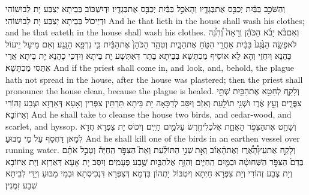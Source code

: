 {וְהַשֹּׁכֵ֣ב בַּבַּ֔יִת יְכַבֵּ֖ס אֶת\maqqaf בְּגָדָ֑יו וְהָאֹכֵ֣ל בַּבַּ֔יִת יְכַבֵּ֖ס אֶת\maqqaf בְּגָדָֽיו׃}
{וּדְיִשְׁכּוֹב בְּבֵיתָא יְצַבַּע יָת לְבוּשׁוֹהִי וּדְיֵיכוֹל בְּבֵיתָא יְצַבַּע יָת לְבוּשׁוֹהִי׃}
{And he that lieth in the house shall wash his clothes; and he that eateth in the house shall wash his clothes.}{}
{וְאִם\maqqaf בֹּ֨א יָבֹ֜א הַכֹּהֵ֗ן וְרָאָה֙ וְ֠הִנֵּ֠ה לֹא\maqqaf פָשָׂ֤ה הַנֶּ֙גַע֙ בַּבַּ֔יִת אַחֲרֵ֖י הִטֹּ֣חַ אֶת\maqqaf הַבָּ֑יִת וְטִהַ֤ר הַכֹּהֵן֙ אֶת\maqqaf הַבַּ֔יִת כִּ֥י נִרְפָּ֖א הַנָּֽגַע׃}
{וְאִם מֵיעָל יֵיעוֹל כָּהֲנָא וְיִחְזֵי וְהָא לָא אוֹסֵיף מַכְתָּשָׁא בְּבֵיתָא בָּתַר דְּאִתְּשָׁע יָת בֵּיתָא וְיִדְכֵּי כָהֲנָא יָת בֵּיתָא אֲרֵי אִתַּסִּי מַכְתָּשָׁא׃}
{And if the priest shall come in, and look, and, behold, the plague hath not spread in the house, after the house was plastered; then the priest shall pronounce the house clean, because the plague is healed.}{}
{וְלָקַ֛ח לְחַטֵּ֥א אֶת\maqqaf הַבַּ֖יִת שְׁתֵּ֣י צִפֳּרִ֑ים וְעֵ֣ץ אֶ֔רֶז וּשְׁנִ֥י תוֹלַ֖עַת וְאֵזֹֽב׃}
{וְיִסַּב לְדַכָּאָה יָת בֵּיתָא תַּרְתֵּין צִפְּרִין וְאָעָא דְּאַרְזָא וּצְבַע זְהוֹרִי וְאֵיזוֹבָא׃}
{And he shall take to cleanse the house two birds, and cedar-wood, and scarlet, and hyssop.}{}
{וְשָׁחַ֖ט אֶת\maqqaf הַצִּפֹּ֣ר הָאֶחָ֑ת אֶל\maqqaf כְּלִי\maqqaf חֶ֖רֶשׂ עַל\maqqaf מַ֥יִם חַיִּֽים׃}
{וְיִכּוֹס יָת צִפְּרָא חֲדָא לְמָאן דַּחֲסַף עַל מֵי מַבּוּעַ׃}
{And he shall kill one of the birds in an earthen vessel over running water.}{}
{וְלָקַ֣ח אֶת\maqqaf עֵֽץ\maqqaf הָ֠אֶ֠רֶז וְאֶת\maqqaf הָ֨אֵזֹ֜ב וְאֵ֣ת \legarmeh  שְׁנִ֣י הַתּוֹלַ֗עַת וְאֵת֮ הַצִּפֹּ֣ר הַֽחַיָּה֒ וְטָבַ֣ל אֹתָ֗ם בְּדַם֙ הַצִּפֹּ֣ר הַשְּׁחוּטָ֔ה וּבַמַּ֖יִם הַֽחַיִּ֑ים וְהִזָּ֥ה אֶל\maqqaf הַבַּ֖יִת שֶׁ֥בַע פְּעָמִֽים׃}
{וְיִסַּב יָת אָעָא דְּאַרְזָא וְיָת אֵיזוֹבָא וְיָת צְבַע זְהוֹרִי וְיָת צִפְּרָא חַיְתָא וְיִטְבּוֹל יָתְהוֹן בִּדְמָא דְּצִפְּרָא דִּנְכִיסְתָא וּבְמֵי מַבּוּעַ וְיַדֵּי לְבֵיתָא שְׁבַע זִמְנִין׃}

